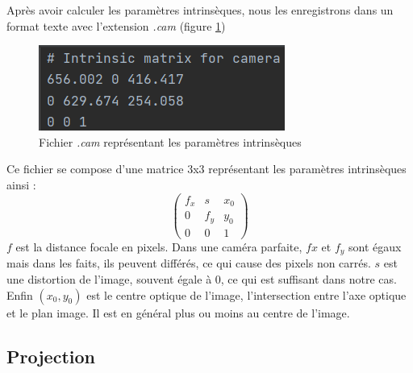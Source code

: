             Après avoir calculer les paramètres intrinsèques, nous les enregistrons dans un format texte avec l'extension \emph{.cam} (figure \ref{fig:cam})

            \begin{figure}[!h]
                \centering
                \includegraphics[scale=0.8]{img/rendu/cam.png}
                \caption{Fichier \emph{.cam} représentant les paramètres intrinsèques}
                \label{fig:cam}
            \end{figure}

            Ce fichier se compose d'une matrice 3x3 représentant les paramètres intrinsèques ainsi :
            \begin{equation*}
                \begin{pmatrix}
                    f_x & s & x_0 \\
                    0 & f_y & y_0 \\
                    0 & 0 & 1
                \end{pmatrix}
            \end{equation*}
            $f$ est la distance focale en pixels. Dans une caméra parfaite, $fx$ et $f_y$ sont égaux mais dans les faits, ils peuvent différés, ce qui cause des pixels non carrés. $s$ est une distortion de l'image, souvent égale à 0, ce qui est suffisant dans notre cas. Enfin $(x_0, y_0)$ est le centre optique de l'image, l'intersection entre l'axe optique et le plan image. Il est en général plus ou moins au centre de l'image. 

        \subsection{Projection}
